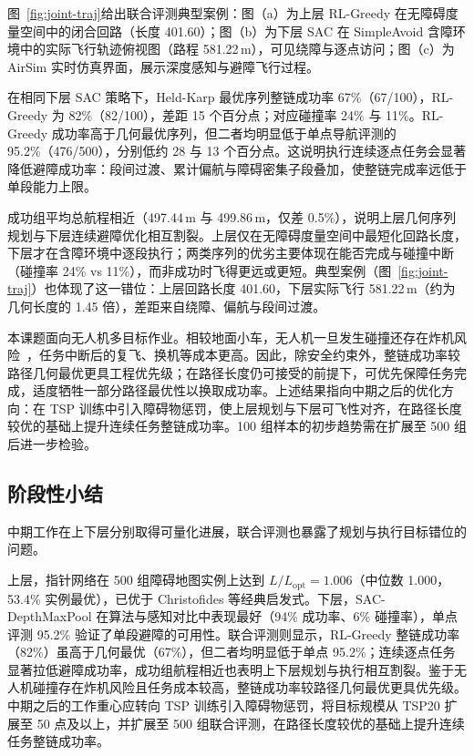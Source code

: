 图~\ref{fig:joint-traj}给出联合评测典型案例：图（a）为上层 RL-Greedy 在无障碍度量空间中的闭合回路（长度 401.60）；图（b）为下层 SAC 在 SimpleAvoid 含障环境中的实际飞行轨迹俯视图（路程 581.22\,m），可见绕障与逐点访问；图（c）为 AirSim 实时仿真界面，展示深度感知与避障飞行过程。

在相同下层 SAC 策略下，Held-Karp 最优序列整链成功率 67\%（67/100），RL-Greedy 为 82\%（82/100），差距 15 个百分点；对应碰撞率 24\% 与 11\%。RL-Greedy 成功率高于几何最优序列，但二者均明显低于单点导航评测的 95.2\%（476/500），分别低约 28 与 13 个百分点。这说明执行连续逐点任务会显著降低避障成功率：段间过渡、累计偏航与障碍密集子段叠加，使整链完成率远低于单段能力上限。

成功组平均总航程相近（497.44\,m 与 499.86\,m，仅差 0.5\%），说明上层几何序列规划与下层连续避障优化相互割裂。上层仅在无障碍度量空间中最短化回路长度，下层才在含障环境中逐段执行；两类序列的优劣主要体现在能否完成与碰撞中断（碰撞率 24\% vs 11\%），而非成功时飞得更远或更短。典型案例（图~\ref{fig:joint-traj}）也体现了这一错位：上层回路长度 401.60，下层实际飞行 581.22\,m（约为几何长度的 1.45 倍），差距来自绕障、偏航与段间过渡。

本课题面向无人机多目标作业。相较地面小车，无人机一旦发生碰撞还存在炸机风险~\cite{fang2024sac}，任务中断后的复飞、换机等成本更高。因此，除安全约束外，整链成功率较路径几何最优更具工程优先级；在路径长度仍可接受的前提下，可优先保障任务完成，适度牺牲一部分路径最优性以换取成功率。上述结果指向中期之后的优化方向：在 TSP 训练中引入障碍物惩罚，使上层规划与下层可飞性对齐，在路径长度较优的基础上提升连续任务整链成功率。100 组样本的初步趋势需在扩展至 500 组后进一步检验。

\subsection{阶段性小结}

中期工作在上下层分别取得可量化进展，联合评测也暴露了规划与执行目标错位的问题。

上层，指针网络在 500 组障碍地图实例上达到 $L/L_{\mathrm{opt}}=1.006$（中位数 1.000，53.4\% 实例最优），已优于 Christofides 等经典启发式。下层，SAC-DepthMaxPool 在算法与感知对比中表现最好（94\% 成功率、6\% 碰撞率），单点评测 95.2\% 验证了单段避障的可用性。联合评测则显示，RL-Greedy 整链成功率（82\%）虽高于几何最优（67\%），但二者均明显低于单点 95.2\%；连续逐点任务显著拉低避障成功率，成功组航程相近也表明上下层规划与执行相互割裂。鉴于无人机碰撞存在炸机风险且任务成本较高，整链成功率较路径几何最优更具优先级。中期之后的工作重心应转向 TSP 训练引入障碍物惩罚，将目标规模从 TSP20 扩展至 50 点及以上，并扩展至 500 组联合评测，在路径长度较优的基础上提升连续任务整链成功率。

